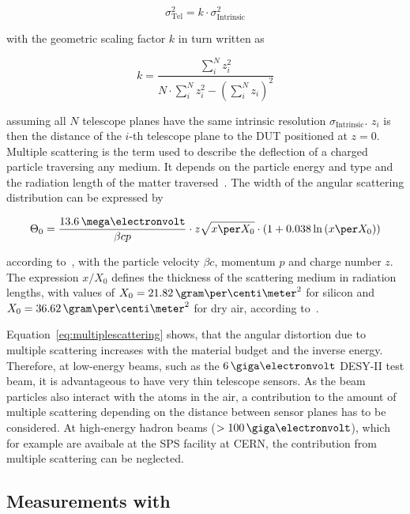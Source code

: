 \begin{equation}
\label{eq:telescopepointing}
\sigma_{\textrm{Tel}}^2 = k \cdot \sigma_{\textrm{Intrinsic}}^2
\end{equation}

\noindent with the geometric scaling factor $k$ in turn written as

\begin{equation}
k = \frac{\sum_i^N z_i^2}{N \cdot \sum_i^N z_i^2 - \left( \sum_i^N z_i
\right)^2}
\end{equation}

\noindent assuming all $N$ telescope planes have the same intrinsic resolution $\sigma_{\textrm{Intrinsic}}$. 
$z_i$ is then the distance of the $i$-th telescope plane to the DUT positioned at $z=0$.
Multiple scattering is the term used to describe the deflection of a charged particle traversing any medium.
It depends on the particle energy and type and the radiation length of the matter traversed~\cite{ref:scatteringhighland}.
The width of the angular scattering distribution can be expressed by

\begin{equation}
\label{eq:multiplescattering}
\Theta_{0} = \frac{13.6\,\mega\electronvolt}{\beta c p} \cdot z
\sqrt{x \per X_0}
\cdot \left( 1 + 0.038 \ln{\left( x \per X_0\right) } \right)
\end{equation}

according to~\cite{ref:PDG-2014}, with the particle velocity $\beta c$, momentum $p$ and charge number $z$. 
The expression $x/X_0$ defines the thickness of the scattering medium in radiation lengths, with values of $X_0 = 21.82\,\allowbreak\gram\per\centi\meter^2$ for silicon and $X_0 = 36.62\,\gram\per\centi\meter^2$ for dry air, according to~\cite{ref:x0values}.

Equation~\ref{eq:multiplescattering} shows, that the angular distortion due to multiple scattering increases with the material budget and the inverse energy.
Therefore, at low-energy beams, such as the $6\,\giga\electronvolt$ DESY-II test beam, it is advantageous to have very thin telescope sensors. 
As the beam particles also interact with the atoms in the air, a contribution to the amount of multiple scattering depending on the distance between sensor planes has to be considered. 
At high-energy hadron beams ($> 100\,\giga\electronvolt$), which for example are avaibale at the SPS facility at CERN, the contribution from multiple scattering can be neglected.

\subsection{Measurements with \Datura}

